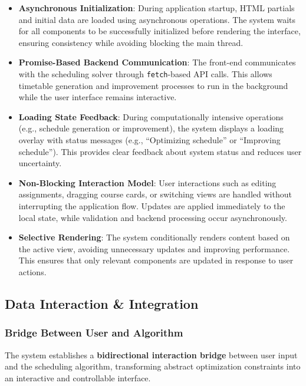 \documentclass[11pt,a4paper]{article}
\begin{document}
\begin{itemize}
    \item \textbf{Asynchronous Initialization}: During application startup, HTML partials and initial data are loaded using asynchronous operations. The system waits for all components to be successfully initialized before rendering the interface, ensuring consistency while avoiding blocking the main thread.
    
    \item \textbf{Promise-Based Backend Communication}: The front-end communicates with the scheduling solver through \texttt{fetch}-based API calls. This allows timetable generation and improvement processes to run in the background while the user interface remains interactive.
    
    \item \textbf{Loading State Feedback}: During computationally intensive operations (e.g., schedule generation or improvement), the system displays a loading overlay with status messages (e.g., ``Optimizing schedule'' or ``Improving schedule''). This provides clear feedback about system status and reduces user uncertainty.
    
    \item \textbf{Non-Blocking Interaction Model}: User interactions such as editing assignments, dragging course cards, or switching views are handled without interrupting the application flow. Updates are applied immediately to the local state, while validation and backend processing occur asynchronously.
    
    \item \textbf{Selective Rendering}: The system conditionally renders content based on the active view, avoiding unnecessary updates and improving performance. This ensures that only relevant components are updated in response to user actions.
\end{itemize}

\subsection{Data Interaction \& Integration}

\subsubsection{Bridge Between User and Algorithm}

The system establishes a \textbf{bidirectional interaction bridge} between user input and the scheduling algorithm, transforming abstract optimization constraints into an interactive and controllable interface.
\end{document}
